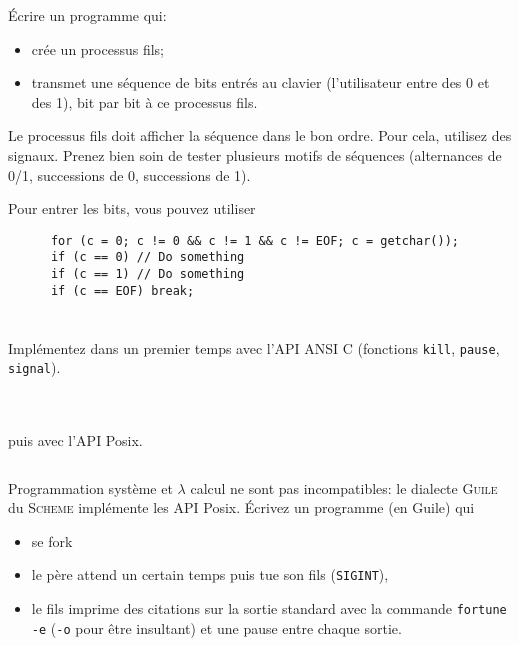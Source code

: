 \documentclass{exam}
\begin{document}
\begin{questions}
    \question{}
    Écrire un programme qui:
    \begin{itemize}
      \item crée un processus fils;
      \item transmet une séquence de bits entrés au clavier (l'utilisateur entre
            des 0 et des 1), bit par bit à ce processus fils.
    \end{itemize}
    Le processus fils doit afficher la séquence dans le bon ordre. Pour cela,
    utilisez des signaux. Prenez bien soin de tester plusieurs motifs de
    séquences (alternances de 0/1, successions de 0, successions de 1).

    Pour entrer les bits, vous pouvez utiliser
    \begin{verbatim}
      for (c = 0; c != 0 && c != 1 && c != EOF; c = getchar());
      if (c == 0) // Do something
      if (c == 1) // Do something
      if (c == EOF) break;
    \end{verbatim}

    \begin{parts}
      \part{}
      Implémentez dans un premier temps avec l'API ANSI C
      (fonctions \texttt{kill}, \texttt{pause}, \texttt{signal}).
      \begin{solution}
        \inputminted{C}{corrected/pingpong1.c}
      \end{solution}
      \part{} puis avec l'API Posix.
      \begin{solution}
        \inputminted{C}{corrected/pingpong4.c}
      \end{solution}
    \end{parts}

  \question{}
  Programmation système et \(\lambda\) calcul ne sont pas incompatibles: le
  dialecte \textsc{Guile} du \textsc{Scheme} implémente les API Posix.
  Écrivez un programme (en Guile) qui
  \begin{itemize}
    \item se fork
    \item le père attend un certain temps puis tue son fils (\texttt{SIGINT}),
    \item le fils imprime des citations sur la sortie standard avec la commande
      \texttt{fortune -e} (\texttt{-o} pour être insultant) et une pause entre
      chaque sortie.
  \end{itemize}


\end{questions}
\end{document}
